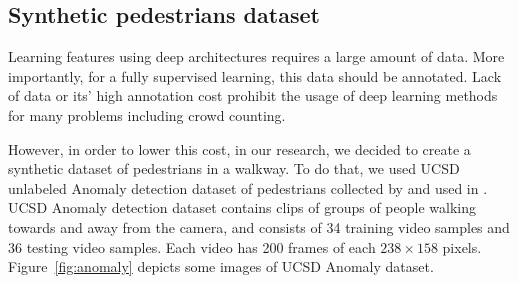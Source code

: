 


\subsection{Synthetic pedestrians dataset}
\label{subsec:synped}

Learning features using deep architectures requires a large amount of data. More importantly, for a fully supervised learning, this data should be annotated. Lack of data or its' high annotation cost prohibit the usage of deep learning methods for many problems including crowd counting. 

\indent However, in order to lower this cost, in our research, we decided to create a synthetic dataset of pedestrians in a walkway. To do that, we used UCSD unlabeled Anomaly detection dataset of pedestrians collected by \citeauthor{chan2008privacy} and used in \cite{chan2009analysis, mahadevan2010anomaly, li2014anomaly}. UCSD Anomaly detection dataset contains clips of groups of people walking towards and away from the camera, and consists of 34 training video samples and 36 testing video samples. Each video has 200 frames of each $238\times158$ pixels. Figure~\ref{fig:anomaly} depicts some images of UCSD Anomaly dataset.

